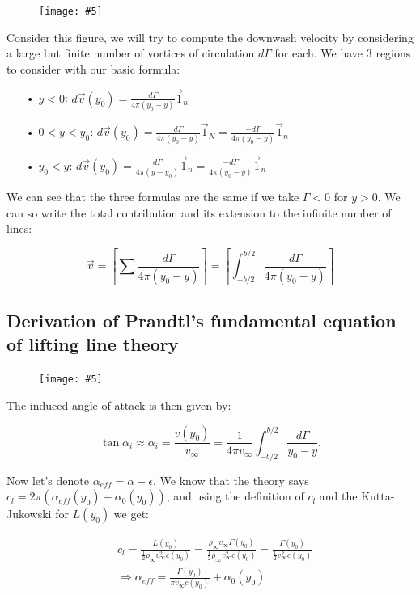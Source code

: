 \documentclass[british,french,11pt, a4paper, openany]{article}
\newcommand{\wrapfig}[6]{%
	\begin{figure}%
		\vspace{-5mm}%
		\texttt{[image: \#5]}%
		\captionof{figure}{}%
		\label{#6}%
	\end{figure}%
}
\begin{document}
\wrapfig{10}{l}{5}{0.08}{ch3/19}{fig:3.19}
Consider this figure, we will try to compute the downwash velocity by considering a large but finite number of vortices of circulation $d \Gamma$ for each. We have 3 regions to consider with our basic formula:

\begin{itemize}
	\item[•] $y<0$: $d\vec{v}(y_0) =  \frac{d \Gamma}{4\pi (y_0-y)}\vec{1}_n$
	\item[•] $0<y<y_0$: $d\vec{v}(y_0) = \frac{d \Gamma}{4\pi (y_0-y)}\vec{1}_N = \frac{-d \Gamma}{4\pi (y_0-y)}\vec{1}_n$
	\item[•] $y_0<y$: $d\vec{v}(y_0) =  \frac{d \Gamma}{4\pi (y-y_0)}\vec{1}_n = \frac{-d \Gamma}{4\pi (y_0-y)}\vec{1}_n$  
\end{itemize}

We can see that the three formulas are the same if we take $\Gamma < 0$ for $y>0$. We can so write the total contribution and its extension to the infinite number of lines:

\begin{equation}
\vec{v} = \left[ \sum \frac{d\Gamma}{4\pi (y_0 - y)} \right] = \left[ \int _{-b/2}^{b/2} \frac{d\Gamma}{4\pi (y_0 - y)} \right]
\end{equation}


\subsection{Derivation of Prandtl’s fundamental equation of lifting line theory}
\wrapfig{10}{l}{5}{0.15}{ch3/20}{fig:3.20}
The induced angle of attack is then given by:

\begin{equation}
\tan \alpha _i \approx \alpha _i = \frac{v(y_0)}{v_\infty} = \frac{1}{4\pi v_\infty} \int _{-b/2} ^{b/2}\frac{d\Gamma}{y_0-y}.
\label{eq:3.18}
\end{equation}

Now let's denote $\alpha _{eff} = \alpha - \epsilon$. We know that the theory says $c_l = 2\pi (\alpha _{eff}(y_0)- \alpha _0(y_0))$, and using the definition of $c_l$ and the Kutta-Jukowski for $L(y_0)$ we get:

\begin{equation}
\begin{aligned}	
&c_l = \frac{L(y_0)}{\frac{1}{2}\rho_\infty v_\infty ^2 c(y_0)} = \frac{\rho _\infty v_\infty \Gamma (y_0)}{\frac{1}{2}\rho_\infty v_\infty ^2 c(y_0)} = \frac{\Gamma (y_0)}{\frac{1}{2}v_\infty ^2 c(y_0)} \\
&\Rightarrow \alpha _{eff} = \frac{\Gamma (y_0)}{\pi v_\infty c(y_0)} + \alpha _0(y_0)
\end{aligned}
\end{equation}
\end{document}
